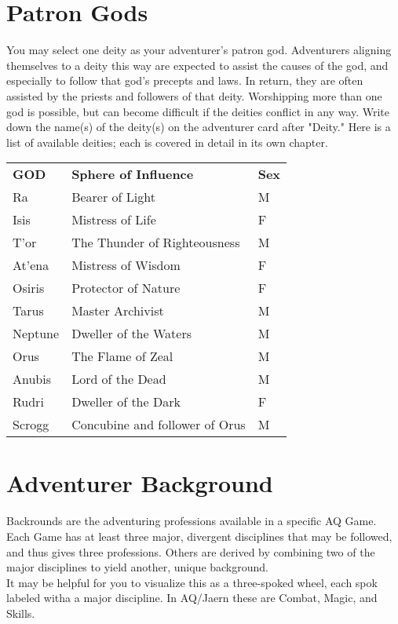 \begin{multicols}{2}
\section{Patron Gods}
You may select one deity as your adventurer’s patron god. Adventurers aligning themselves to a deity this way are expected to assist the causes of the god, and especially to follow that god’s precepts and laws. In return, they are often assisted by the priests and followers of that deity. Worshipping more than one god is possible, but can become difficult if the deities conflict in any way. Write down the name(s) of the deity(s) on the adventurer card after "Deity." Here is a list of available deities; each is covered in detail in its own chapter.

\begin{tabular}{l l l}
\textbf{GOD} & \textbf{Sphere of Influence} & \textbf{Sex}\\
Ra & Bearer of Light & M\\
Isis & Mistress of Life & F\\
T’or & The Thunder of Righteousness & M\\
At’ena & Mistress of Wisdom & F\\
Osiris & Protector of Nature & F\\
Tarus & Master Archivist & M\\
Neptune & Dweller of the Waters & M\\
Orus & The Flame of Zeal & M\\
Anubis & Lord of the Dead & M\\
Rudri & Dweller of the Dark & F\\
Scrogg & Concubine and follower of Orus & M\\
\end{tabular}
\section{Adventurer Background}
Backrounds are the adventuring professions available in a specific AQ Game. Each Game has at least three major, divergent disciplines that may be followed, and thus gives three professions. Others are derived by combining two of the major disciplines to yield another, unique background.\\
It may be helpful for you to visualize this as a three-spoked wheel, each spok labeled witha a major discipline. In AQ/Jaern these are Combat, Magic, and Skills.

\begin{center}


\end{center}
\end{multicols}
